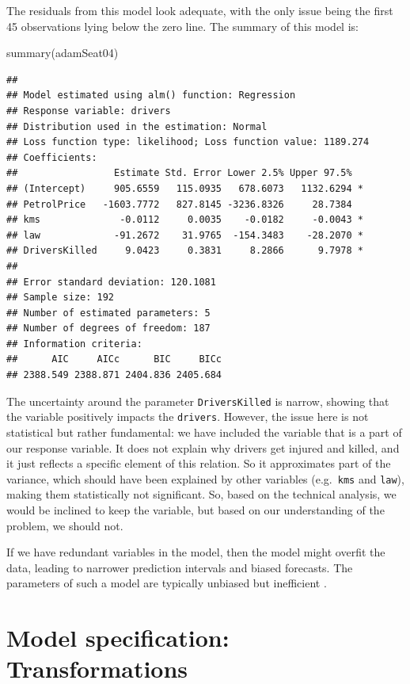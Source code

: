 \documentclass[
]{book}
\newenvironment{Shaded}{\begin{snugshade}}{\end{snugshade}}
\newcommand{\FunctionTok}[1]{\textcolor[rgb]{0.00,0.00,0.00}{#1}}
\newcommand{\NormalTok}[1]{#1}
\theoremstyle{definition}
\theoremstyle{definition}
\theoremstyle{definition}
\theoremstyle{definition}
\theoremstyle{remark}
\begin{document}
The residuals from this model look adequate, with the only issue being the first 45 observations lying below the zero line. The summary of this model is:

\begin{Shaded}
\begin{Highlighting}[]
\FunctionTok{summary}\NormalTok{(adamSeat04)}
\end{Highlighting}
\end{Shaded}

\begin{verbatim}
## 
## Model estimated using alm() function: Regression
## Response variable: drivers
## Distribution used in the estimation: Normal
## Loss function type: likelihood; Loss function value: 1189.274
## Coefficients:
##                 Estimate Std. Error Lower 2.5% Upper 97.5%  
## (Intercept)     905.6559   115.0935   678.6073   1132.6294 *
## PetrolPrice   -1603.7772   827.8145 -3236.8326     28.7384  
## kms              -0.0112     0.0035    -0.0182     -0.0043 *
## law             -91.2672    31.9765  -154.3483    -28.2070 *
## DriversKilled     9.0423     0.3831     8.2866      9.7978 *
## 
## Error standard deviation: 120.1081
## Sample size: 192
## Number of estimated parameters: 5
## Number of degrees of freedom: 187
## Information criteria:
##      AIC     AICc      BIC     BICc 
## 2388.549 2388.871 2404.836 2405.684
\end{verbatim}

The uncertainty around the parameter \texttt{DriversKilled} is narrow, showing that the variable positively impacts the \texttt{drivers}. However, the issue here is not statistical but rather fundamental: we have included the variable that is a part of our response variable. It does not explain why drivers get injured and killed, and it just reflects a specific element of this relation. So it approximates part of the variance, which should have been explained by other variables (e.g.~\texttt{kms} and \texttt{law}), making them statistically not significant. So, based on the technical analysis, we would be inclined to keep the variable, but based on our understanding of the problem, we should not.

If we have redundant variables in the model, then the model might overfit the data, leading to narrower prediction intervals and biased forecasts. The parameters of such a model are typically unbiased but inefficient \citep[Section 4.3 of][]{SvetunkovSBA}.

\hypertarget{diagnosticsTransformations}{%
\section{Model specification: Transformations}\label{diagnosticsTransformations}}
\end{document}
